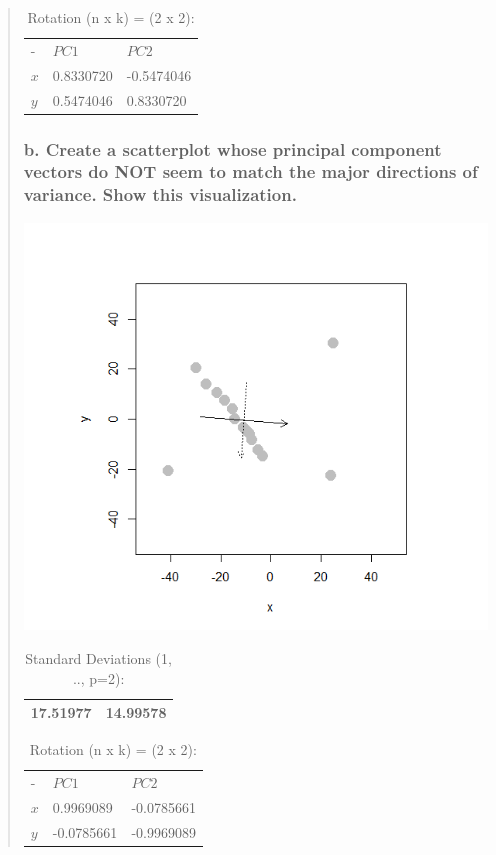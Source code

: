 \documentclass[
]{article}
\begin{document}
\begin{quote}
\begin{longtable}[]{@{}lll@{}}
\caption{Rotation (n x k) = (2 x 2):}\tabularnewline
\toprule
\endhead
- & \(PC1\) & \(PC2\) \\
\(x\) & 0.8330720 & -0.5474046 \\
\(y\) & 0.5474046 & 0.8330720 \\
\bottomrule
\end{longtable}

\hypertarget{b.-create-a-scatterplot-whose-principal-component-vectors-do-not-seem-to-match-the-major-directions-of-variance.-show-this-visualization.}{%
\subsubsection{b. Create a scatterplot whose principal component vectors
do NOT seem to match the major directions of variance. Show this
visualization.}\label{b.-create-a-scatterplot-whose-principal-component-vectors-do-not-seem-to-match-the-major-directions-of-variance.-show-this-visualization.}}

\includegraphics{images/PCA.png}

\begin{longtable}[]{@{}ll@{}}
\caption{Standard Deviations (1, .., p=2):}\tabularnewline
\toprule
\endhead
17.51977 & 14.99578 \\
\bottomrule
\end{longtable}

\begin{longtable}[]{@{}lll@{}}
\caption{Rotation (n x k) = (2 x 2):}\tabularnewline
\toprule
\endhead
- & \(PC1\) & \(PC2\) \\
\(x\) & 0.9969089 & -0.0785661 \\
\(y\) & -0.0785661 & -0.9969089 \\
\bottomrule
\end{longtable}
\end{quote}
\end{document}
